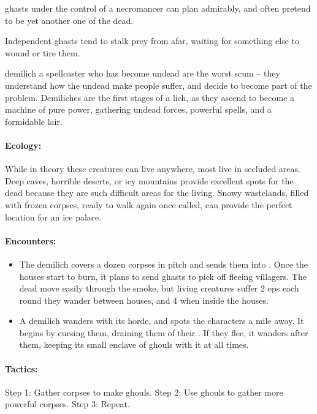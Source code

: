 \begin{multicols}{2}

\Glspl{ghast} under the control of a necromancer can plan admirably, and often pretend to be yet another one of the dead.

Independent \glspl{ghast} tend to stalk prey from afar, waiting for something else to wound or tire them.

  {demilich}%
  {a spellcaster who has become undead}%
are the worst scum -- they understand how the undead make people suffer, and decide to become part of the problem.
Demiliches are the first stages of a lich, as they ascend to become a machine of pure power, gathering undead forces, powerful spells, and a formidable lair.

\paragraph{Ecology:} While in theory these creatures can live anywhere, most live in secluded areas.
Deep caves, horrible deserts, or icy mountains provide excellent spots for the dead because they are such difficult areas for the living.
Snowy wastelands, filled with frozen corpses, ready to walk again once called, can provide the perfect location for an ice palace.

\paragraph{Encounters:}

\begin{itemize}
  \item
  The demilich covers a dozen corpses in pitch and sends them into .
  Once the houses start to burn, it plans to send \glspl{ghast} to pick off fleeing villagers.
  The dead move easily through the smoke, but living creatures suffer 2 \glspl{ep} each round they wander between houses, and 4 when inside the houses.
  \item
  A demilich wanders with its horde, and spots the characters a mile away.
  It begins by cursing them, draining them of their .
  If they flee, it wanders after them, keeping its small enclave of \glspl{ghoul} with it at all times.

\end{itemize}

\paragraph{Tactics:}
Step 1: Gather corpses to make \glspl{ghoul}.
Step 2: Use \glspl{ghoul} to gather more powerful corpses.
Step 3: Repeat.


\end{multicols}
